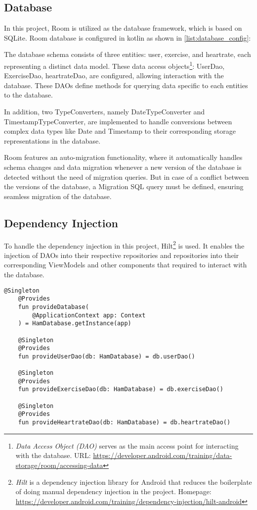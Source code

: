 \subsection{Database}
In this project, Room is utilized as the database framework, which is based on SQLite. Room database is configured in kotlin as shown in \autoref{list:database_config}:

The database schema consists of three entities: user, exercise, and heartrate, each representing a distinct data model.
These data access objects\footnote{\emph{Data Access Object (DAO)} serves as the main access point for interacting with the database. URL: \url{https://developer.android.com/training/data-storage/room/accessing-data}}: UserDao, ExerciseDao, heartrateDao, are configured, allowing interaction with the database. These DAOs define methods for querying data specific to each entities to the database.

In addition, two TypeConverters, namely DateTypeConverter and TimestampTypeConverter, are implemented to handle conversions between complex data types like Date and Timestamp to their corresponding storage representations in the database.

Room features an auto-migration functionality, where it automatically handles schema changes and data migration whenever a new version of the database is detected without the need of migration queries.
But in case of a conflict between the versions of the database, a Migration SQL query must be defined, ensuring seamless migration of the database.

\subsection{Dependency Injection}
To handle the dependency injection in this project, Hilt\footnote{\emph{Hilt} is a dependency injection library for Android that reduces the boilerplate of doing manual dependency injection in the project. Homepage: \url{https://developer.android.com/training/dependency-injection/hilt-android}} is used. 
It enables the injection of DAOs into their respective repositories and repositories into their corresponding ViewModels and other components that required to interact with the database. 
\begin{lstlisting}[caption={Dependency injection configuration (AppModule)}]
    @Singleton
    @Provides
    fun provideDatabase(
        @ApplicationContext app: Context
    ) = HamDatabase.getInstance(app)

    @Singleton
    @Provides
    fun provideUserDao(db: HamDatabase) = db.userDao()

    @Singleton
    @Provides
    fun provideExerciseDao(db: HamDatabase) = db.exerciseDao()

    @Singleton
    @Provides
    fun provideHeartrateDao(db: HamDatabase) = db.heartrateDao()
\end{lstlisting}
